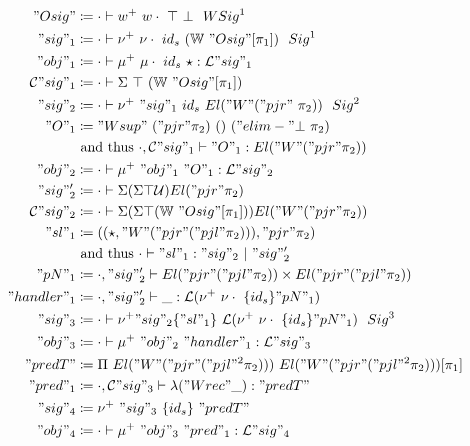 \begin{figure}
  \begin{minipage}[t]{0.4\linewidth}
  \small
\begin{align*}
  "Osig" &\coloneqq \goodWSig{\cdot}{w^+\ w\cdot\ \top\ \bot}{1} \\
  "sig"_1 &\coloneqq \goodSig{\cdot}{\nu^+ \ \nu\cdot \ {id_s} \ (\bW \ "Osig"[\pi_1])}{1}  \\
  "obj"_1 &\coloneqq \goodTerm{\cdot}{\mu^+ \ \mu\cdot \ {id_s} \ \star}{\cL"sig"_1}\\
  \cC"sig"_1 &\coloneqq \goodType{\cdot}{\Sigma \ \top \ (\bW \ "Osig"[\pi_1]) }{} \\
  "sig"_2 &\coloneqq  \goodSig{\cdot}{\nu^+ \ "sig"_1 \ {id_s} \ El ("W" ("pjr" \ \pi_2))}{2} \\ 
  "O"_1 &\coloneqq {"Wsup" \ ("pjr" \pi_2) \ () \ ("elim-"\bot \ \pi_2)}  \\ 
  & \text{ and thus }  \goodTerm{\cdot, \cC"sig"_1}{"O"_1}{El ("W" ("pjr" \pi_2))} \\
  "obj"_2 &\coloneqq \goodTerm{\cdot}{\mu^+ \ "obj"_1 \ "O"_1}{\cL"sig"_2} \\
  "sig"_2' &\coloneqq \goodType{\cdot}{\Sigma (\Sigma \top \cU)El ("pjr" \pi_2)}{} \\ 
  \cC"sig"_2 &\coloneqq \goodType{\cdot}{\Sigma (\Sigma \top (\bW \ "Osig"[\pi_1]))El ("W"("pjr" \pi_2)) }{} \\ 
  "sl"_1 &\coloneqq ((\star, "W" ("pjr" ("pjl" \pi_2)) ), "pjr" \pi_2) \\ 
  & \text{ and thus }  \goodSeal{\cdot}{"sl"_1}{"sig"_2}{"sig"_2'} \\
  "pN"_1 &\coloneqq \goodType{\cdot, "sig"_2'}{El ("pjr" ("pjl" \pi_2)) \times El ("pjr" ("pjl" \pi_2))}{} \\
  "handler"_1 &\coloneqq \goodTerm{\cdot, "sig"_2'}{\_}{\cL(\nu^+ \ \nu\cdot \ \{id_s\} "pN"_1)} \\
  "sig"_3 &\coloneqq \goodSig{\cdot}{\nu^+ "sig"_2 \{"sl"_1\} \ \cL(\nu^+ \ \nu\cdot \ \{id_s\} "pN"_1)}{3} \\ 
  "obj"_3 &\coloneqq \goodTerm{\cdot}{\mu^+~"obj"_2~"handler"_1}{\cL"sig"_3}\\
  "predT" &\coloneqq \Pi \ El ("W"("pjr" ("pjl"^2 \pi_2)))\ El ("W" ("pjr" ("pjl"^2  \pi_2)))[\pi_1] \\
  "pred"_1 &\coloneqq \goodTerm{\cdot, \cC "sig"_3}{\lambda ("Wrec" \_)}{"predT"} \\ 
  "sig"_4 &\coloneqq \nu^+ \ "sig"_3 \ \{id_s\} \ "predT" \\ 
  "obj"_4 &\coloneqq \goodTerm{\cdot}{\mu^+~"obj"_3~"pred"_1}{\cL"sig"_4}\\

\end{align*}
\end{minipage}
\end{figure}
